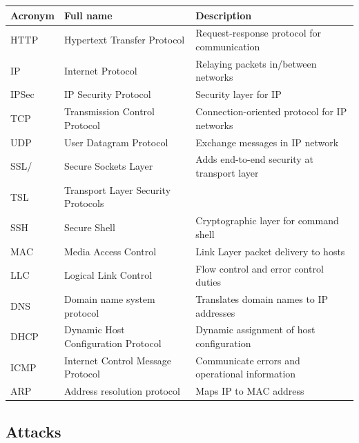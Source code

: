 \documentclass[12pt]{article}
\begin{document}
	\begin{tabular}{|l|l|l|}
		\hline 
		\textbf{Acronym} & \textbf{Full name} & \textbf{Description} \\ 
		\hline 
		HTTP & Hypertext Transfer Protocol & Request-response protocol for communication \\ 
		\hline 
		IP & Internet Protocol & Relaying packets in/between networks \\ 
		\hline 
		IPSec & IP Security Protocol & Security layer for IP \\ 
		\hline 
		TCP & Transmission Control Protocol & Connection-oriented protocol for IP networks \\ 
		\hline
		UDP & User Datagram Protocol & Exchange messages in IP network \\ 
		\hline 
		SSL/ & Secure Sockets Layer & Adds end-to-end security at transport layer \\ 
		TSL & Transport Layer Security Protocols & \\ 
		\hline 
		SSH & Secure Shell & Cryptographic layer for command shell \\ 
		\hline 
		MAC & Media Access Control & Link Layer packet delivery to hosts \\ 
		\hline 
		LLC & Logical Link Control & Flow control and error control duties \\ 
		\hline 
		DNS & Domain name system protocol & Translates domain names to IP addresses \\ 
		\hline 
		DHCP & Dynamic Host Configuration Protocol & Dynamic assignment of host configuration \\ 
		\hline 
		ICMP & Internet Control Message Protocol & Communicate errors and operational information \\ 
		\hline 
		ARP & Address resolution protocol & Maps IP to MAC address \\ 
		\hline 
	\end{tabular} 

	\subsection{Attacks}
\end{document}
